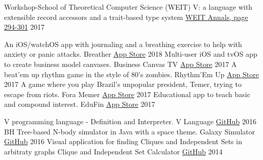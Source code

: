 

\begin{cventries}
  \cventry
    {Workshop-School of Theoretical Computer Science (WEIT)}
    {V: a language with extensible record accessors and a trait-based type system}
    {\href{http://weit2017.inf.ufsm.br/wp-content/uploads/2017/10/Versao_final.pdf}{WEIT Annals, page 294-301}}
    {2017}
    {
    }
\end{cventries}


\begin{cventries}
  \cvcompactentry
    {An iOS/watchOS app with journaling and a breathing exercise to help with anxiety or panic attacks.}
    {Breather}
    {\href{https://itunes.apple.com/app/id1370659046?mt=8}{App Store}}
    {2018}
  \cvcompactentry
    {Multi-user iOS and tvOS app to create business model canvases.}
    {Business Canvas TV}
    {\href{https://itunes.apple.com/app/id1292335686?mt=8}{App Store}}
    {2017}
  \cvcompactentry
    {A beat'em up rhythm game in the style of 80's zombies.}
    {Rhythm'Em Up}
    {\href{https://itunes.apple.com/app/id1231577657?mt=8}{App Store}}
    {2017}
  \cvcompactentry
    {A game where you play Brazil's unpopular president, Temer, trying to escape from riots.}
    {Fora Memer}
    {\href{https://itunes.apple.com/br/app/fora-memer/id1253655537?l=en&mt=8}{App Store}}
    {2017}
  \cvcompactentry
    {Educational app to teach basic and compound interest.}
    {EduFin}
    {\href{https://itunes.apple.com/app/id1231577657?mt=8}{App Store}}
    {2017}
\end{cventries}


\begin{cventries}
  \cvcompactentry
    {V programming language - Definition and Interpreter.}
    {V Language}
    {\href{https://github.com/AvatarHurden/V}{GitHub}}
    {2016}
  \cvcompactentry
    {BH Tree-based N-body simulator in Java with a space theme.}
    {Galaxy Simulator}
    {\href{https://github.com/AvatarHurden/Simulador-Galaxias}{GitHub}}
    {2016}
  \cvcompactentry
    {Visual application for finding Cliques and Independent Sets in arbitraty graphs}
    {Clique and Independent Set Calculator}
    {\href{https://github.com/AvatarHurden/Clique-and-Ind.Set-Calculator}{GitHub}}
    {2014}
\end{cventries}

